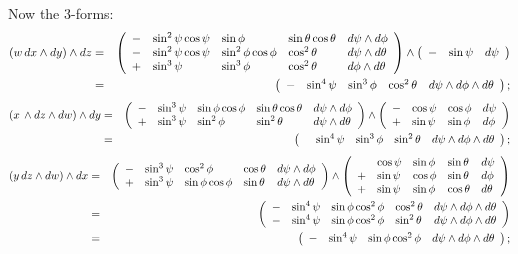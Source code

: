\documentclass[10pt]{article}
\numberwithin{equation}{subsection}
\begin{document}
Now the 3-forms:
\begin{eqnarray*}
	(w\,dx\wedge dy) \wedge dz
	&=& \left(\begin{array}{llllllllllll} 
			-& \sin^2\psi \cos\psi &\sin\phi           &\sin\theta\cos\theta &d\psi\wedge d\phi \\
			-& \sin^2\psi \cos\psi &\sin^2\phi\cos\phi &\cos^2\theta         &d\psi\wedge d\theta \\
			+& \sin^3\psi          &\sin^3\phi         &\cos^2\theta         &d\phi\wedge d\theta
		 \end{array}\right)
		\wedge
		\left(\begin{array}{llllllllllll} 
			-&\sin\psi &d\psi
		 \end{array}\right) \\
	&=& \left(\begin{array}{llllllllllll} 
		-&\sin^4\psi &\sin^3\phi &\cos^2\theta &d\psi \wedge d\phi\wedge d\theta
		 \end{array}\right);
\end{eqnarray*}
\begin{eqnarray*}
	(x\,\wedge dz \wedge dw) \wedge dy
	&=& \plmatrix {
		-& \sin^3\psi &\sin\phi\cos\phi &\sin\theta\cos\theta &d\psi\wedge d\phi \\
		+& \sin^3\psi &\sin^2\phi       &\sin^2\theta         &d\psi \wedge d\theta
		}
	\wedge
	\plmatrix{
		-& \cos\psi & \cos\phi &d\psi \\
		+& \sin\psi & \sin\phi &d\phi
	} \\
%
	&=& \plmatrix{
		&\sin^4\psi &\sin^3\phi &\sin^2\theta &d\psi \wedge d\phi \wedge d\theta
		};
\end{eqnarray*}
\begin{eqnarray*}
	\left(y\,dz \wedge dw\right) \wedge dx
	&=& \plmatrix{
		-& \sin^3\psi &\cos^2\phi       &\cos\theta &d\psi \wedge d\phi \\
		+& \sin^3\psi &\sin\phi\cos\phi &\sin\theta &d\psi \wedge d\theta
		}
	\wedge
	\plmatrix{
		&  \cos\psi &\sin\phi &\sin\theta &d\psi \\
		+& \sin\psi &\cos\phi &\sin\theta &d\phi\\
		+& \sin\psi &\sin\phi &\cos\theta &d\theta
	} \\
%
	&=& \plmatrix{
			-& \sin^4\psi &\sin\phi\cos^2\phi &\cos^2\theta &d\psi \wedge d\phi \wedge d\theta \\
			-& \sin^4\psi &\sin\phi\cos^2\phi &\sin^2\theta &d\psi \wedge d\phi \wedge d\theta
		} \\
	&=& \plmatrix{
		-&\sin^4\psi &\sin\phi\cos^2\phi &d\psi \wedge d\phi \wedge d\theta
	};
\end{eqnarray*}
\end{document}
